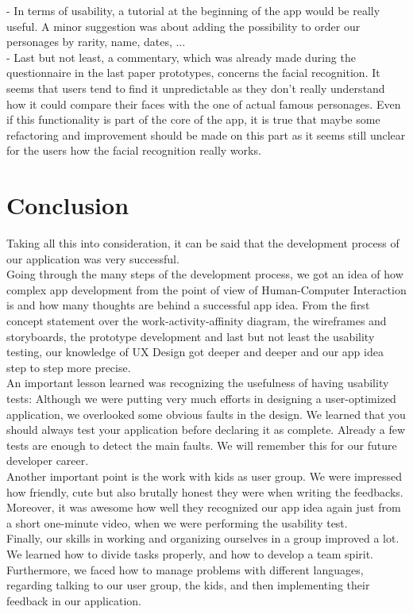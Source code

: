 \documentclass[12pt]{scrartcl}
\begin{document}
		- In terms of usability, a tutorial at the beginning of the app would be really useful. A minor suggestion was about adding the possibility to order our personages by rarity, name, dates, ...\\

		- Last but not least, a commentary, which was already made during the questionnaire in the last paper prototypes, concerns the facial recognition. It seems that users tend to find it unpredictable as they don’t really understand how it could compare their faces with the one of actual famous personages. Even if this functionality is part of the core of the app, it is true that maybe some refactoring and improvement should be made on this part as it seems still unclear for the users how the facial recognition really works.
		
		\newpage

	
\section{Conclusion}

	
	Taking all this into consideration, it can be said that the development process of our application was very successful.\\

	Going through the many steps of the development process, we got an idea of how complex app development from the point of view of Human-Computer Interaction is and how many thoughts are behind a successful app idea. From the first concept statement over the work-activity-affinity diagram, the wireframes and storyboards, the prototype development and last but not least the usability testing, our knowledge of UX Design got deeper and deeper and our app idea step to step more precise.\\
	
	An important lesson learned was recognizing the usefulness of having usability tests: Although we were putting very much efforts in designing a user-optimized application, we overlooked some obvious faults in the design. We learned that you should always test your application before declaring it as complete. Already a few tests are enough to detect the main faults. We will remember this for our future developer career.\\
	
	Another important point is the work with kids as user group. We were impressed how friendly, cute but also brutally honest they were when writing the feedbacks. Moreover, it was awesome how well they recognized our app idea again just from a short one-minute video, when we were performing the usability test.\\
	
	Finally, our skills in working and organizing ourselves in a group improved a lot. We learned how to divide tasks properly, and how to develop a team spirit. Furthermore, we faced how to manage problems with different languages, regarding talking to our user group, the kids, and then implementing their feedback in our application.
	
	
\end{document}
